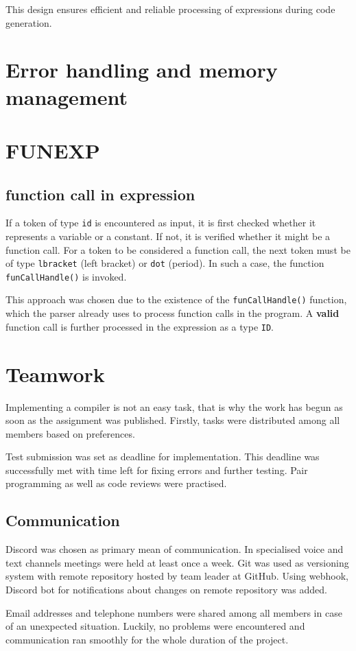 \documentclass[a4paper, 11pt]{article}
\begin{document}
This design ensures efficient and reliable processing of expressions during code generation.


\section{Error handling and memory management}\label{sec:ERR}

\section{FUNEXP}
\subsection{function call in expression}
If a token of type \verb|id| is encountered as input, it is first checked whether it represents a variable 
or a constant. If not, it is verified whether it might be a function call. For a token to be considered a 
function call, the next token must be of type \verb|lbracket| (left bracket) or \verb|dot| (period). In such a 
case, the function \verb|funCallHandle()| is invoked.
\par
This approach was chosen due to the existence of the \verb|funCallHandle()| function, which the parser already 
uses to process function calls in the program. A \textbf{valid} function call is further processed in the expression 
as a type \verb|ID|.


\section{Teamwork}\label{sec:TEAM}
Implementing a compiler is not an easy task, that is why the work has begun as soon as 
the assignment was published. Firstly, tasks were distributed among all members based on 
preferences.\par 
Test submission was set as deadline for implementation. This deadline
was successfully met with time left for fixing errors and further testing. Pair programming as well as 
code reviews were practised. 

\subsection{Communication}\label{sec:COMM}
Discord was chosen as primary mean of communication. In specialised voice and text channels meetings were
held at least once a week. Git was used as versioning system with remote repository hosted by team leader at
GitHub. Using webhook, Discord bot for notifications about changes on remote repository was added.\par
Email addresses and telephone numbers were shared among all members in case of an unexpected situation.
Luckily, no problems were encountered and communication ran smoothly for the whole duration of the project.
\end{document}
